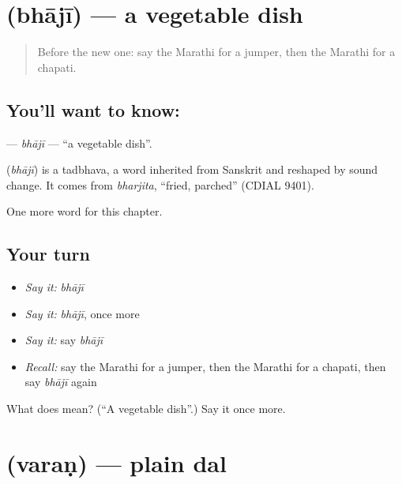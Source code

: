 \section[\texorpdfstring{\mr{भाजी} (bhājī)}{भाजी (bhājī)}]{ (bhājī) — a vegetable dish}

\label{lesson:MR-C136-bhaji}



\begin{quote}
Before the new one: say the Marathi for a jumper, then the Marathi for a chapati.
\end{quote}

\subsection*{You'll want to know: }
\textbf{} — \emph{bhājī} — \textquotedblleft{}a vegetable dish\textquotedblright{}.

\begin{cousinweb}
\textbf{} (\emph{bhājī}) is a tadbhava, a word inherited from Sanskrit and reshaped by sound change. It comes from \emph{bharjita}, \textquotedblleft{}fried, parched\textquotedblright{} (CDIAL 9401).
\end{cousinweb}

\begin{grammarlens}[title={What you've built}]
One more word for this chapter.
\end{grammarlens}

\subsection*{Your turn}
\begin{itemize}
\raggedright
  \item \emph{Say it:} \emph{bhājī}
  \item \emph{Say it:} \emph{bhājī}, once more
  \item \emph{Say it:} say \emph{bhājī}
  \item \emph{Recall:} say the Marathi for a jumper, then the Marathi for a chapati, then say \emph{bhājī} again
\end{itemize}

\begin{tcolorbox}[breakable,colback=teal!4,colframe=teal!35!black,title={Before you move on}]
What does  mean? (\textquotedblleft{}A vegetable dish\textquotedblright{}.) Say it once more.
\end{tcolorbox}
\section[\texorpdfstring{\mr{वरण} (varaṇ)}{वरण (varaṇ)}]{ (varaṇ) — plain dal}


